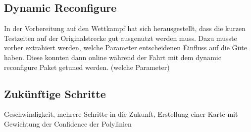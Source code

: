 \subsection{Dynamic Reconfigure}
In der Vorbereitung auf den Wettkampf hat sich herausgestellt, dass die kurzen Testzeiten auf der Originalstrecke gut ausgenutzt werden muss. Dazu musste vorher extrahiert werden, welche Parameter entscheidenen Einfluss auf die Güte haben. Diese konnten dann online während der Fahrt mit dem dynamic reconfigure Paket getuned werden. (welche Parameter)\\
\subsection{Zukünftige Schritte}
Geschwindigkeit, mehrere Schritte in die Zukunft, Erstellung einer Karte mit Gewichtung der Confidence der Polylinien